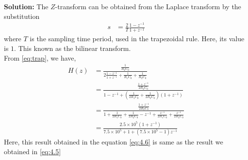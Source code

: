 \documentclass[journal,12pt,twocolumn]{IEEEtran}
\newcommand{\solution}{\noindent \textbf{Solution: }}
\providecommand{\brak}[1]{\ensuremath{\left(#1\right)}}
\numberwithin{equation}{section}
\renewcommand\thesection{\arabic{section}}
\begin{document}
\begin{enumerate}[label=\thesection.\arabic*.,ref=\thesection.\theenumi]
	\solution The $Z$-transform can be obtained from the Laplace transform by the substitution
	\begin{align}
		s &= \frac{2}{T} \frac{1-z^{-1}}{1+z^{-1}}
	\end{align}
	where $T$ is the sampling time period, used in the trapezoidal rule. Here, its value is $1$. This known as the bilinear transform.\\
	From \eqref{eq:trap}, we have,
	\begin{align}
		H(z) &= \frac{\frac{1}{R_2C_0}}{2\frac{1-z^{-1}}{1+z^{-1}} + \frac{1}{R_1C_0} + \frac{1}{R_2C_0}} \\
		&= \frac{\frac{1 + z^{-1}}{2R_2C_0}}{1-z^{-1}	 + \brak{\frac{1}{2R_1C_0} + \frac{1}{2R_2C_0}}(1 + z^{-1})} \\
		&= \frac{\frac{1 + z^{-1}}{2R_2C_0}}{1 + \frac{1}{2R_1C_0} + \frac{1}{2R_2C_0} - z^{-1} + \frac{z^{-1}}{2R_1C_0} + \frac{z^{-1}}{2R_2C_0}} \\
		\label{eq:4.6}
		&= \frac{2.5\times10^5 (1+z^{-1})}{7.5\times10^5 + 1 + (7.5\times10^5 - 1)z^{-1}}
	\end{align}
Here, this result obtained in the equation \eqref{eq:4.6} is same as the result we obtained in \eqref{eq:4.5}


\end{enumerate}
\end{document}
